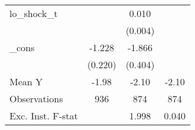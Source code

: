 {\begin{tabular}{l*{3}{c}}
\addlinespace
lo\_shock\_t  &                     &       0.010\sym{**} &                     \\
            &                     &     (0.004)         &                     \\
\addlinespace
\_cons      &      -1.228\sym{***}&      -1.866\sym{***}&                     \\
            &     (0.220)         &     (0.404)         &                     \\
\midrule
Mean Y      &       -1.98         &       -2.10         &       -2.10         \\
Observations&         936         &         874         &         874         \\
Exc. Inst. F-stat&                     &       1.998         &       0.040         \\
\bottomrule
\end{tabular}
}
